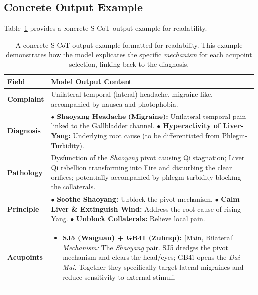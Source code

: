 \documentclass[preprint,5p,times,twocolumn,fleqn]{elsarticle}
\begin{document}
\subsection{Concrete Output Example}
Table~\ref{tab:example_instance} provides a concrete S-CoT output example for readability.

\begin{table}[htbpt]
  \centering
  \small
  \renewcommand{\arraystretch}{1.2}
  \setlength{\tabcolsep}{6pt}
  \caption{A concrete S-CoT output example formatted for readability. This example demonstrates how the model explicates the specific \textit{mechanism} for each acupoint selection, linking back to the diagnosis.}
  \label{tab:example_instance}
  \begin{tabularx}{\textwidth}{@{}l X@{}}
    \toprule
    \textbf{Field} & \textbf{Model Output Content} \\
    \midrule
    \textbf{Complaint} & Unilateral temporal (lateral) headache, migraine-like, accompanied by nausea and photophobia. \\
    \addlinespace[4pt]
    \textbf{Diagnosis} & $\bullet$ \textbf{Shaoyang Headache (Migraine):} Unilateral temporal pain linked to the Gallbladder channel. \newline
                         $\bullet$ \textbf{Hyperactivity of Liver-Yang:} Underlying root cause (to be differentiated from Phlegm-Turbidity). \\
    \addlinespace[4pt]
    \textbf{Pathology} & Dysfunction of the \textit{Shaoyang} pivot causing Qi stagnation; Liver Qi rebellion transforming into Fire and disturbing the clear orifices; potentially accompanied by phlegm-turbidity blocking the collaterals. \\
    \addlinespace[4pt]
    \textbf{Principle} & $\bullet$ \textbf{Soothe Shaoyang:} Unblock the pivot mechanism. \newline
                         $\bullet$ \textbf{Calm Liver \& Extinguish Wind:} Address the root cause of rising Yang. \newline
                         $\bullet$ \textbf{Unblock Collaterals:} Relieve local pain. \\
    \addlinespace[4pt]
    \textbf{Acupoints} &
    \begin{itemize}[leftmargin=1.2em, nosep, before=\vspace{-0.5em}, after=\vspace{-0.5em}]
      \item \textbf{SJ5 (Waiguan) + GB41 (Zulinqi):} [Main, Bilateral] \newline
      \textit{Mechanism:} The \textit{Shaoyang} pair. SJ5 dredges the pivot mechanism and clears the head/eyes; GB41 opens the \textit{Dai Mai}. Together they specifically target lateral migraines and reduce sensitivity to external stimuli.
      

\end{itemize}
\end{tabularx}
\end{table}
\end{document}
